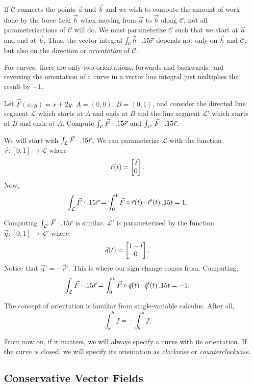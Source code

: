 If $\mathcal C$ connects the points $\vec a$ and $\vec b$ and we wish to compute
the amount of work done by the force field $\vec h$ when moving from $\vec a$ to
$\vec b$ along $\mathcal C$, not all parameterizations of $\mathcal C$ will
do.  We must parameterize $\mathcal C$ such that we start at $\vec a$ and
end at $\vec b$.  Thus, the vector integral $\int_{\mathcal C} \vec h\cdot .15\vec r$
depends not only on $\vec h$ and $\mathcal C$, but also on the direction
or \emph{orientation} of $\mathcal C$.

For curves, there are only two orientations, forwards and backwards,
and reversing the orientation of a curve in a vector line integral just multiplies
the result by $-1$.

\begin{example}
	Let $\vec F(x,y)=x+2y$, $A=(0,0)$, $B=(0,1)$, and consider the 
	directed line
	segment $\mathcal L$ which starts at $A$ and ends at $B$ and the line
	segment $\mathcal L'$ which starts at $B$ and ends at $A$.  Compute
	$\int_{\mathcal L}\vec F\cdot .15 \vec r$ and $\int_{\mathcal L'}\vec F\cdot .15 \vec r$.

	We will start with $\int_{\mathcal L}\vec F\cdot .15 \vec r$.  We can
	parameterize $\mathcal L$ with the function $\vec r:[0,1]\to\mathcal L$ where
	\[
		\vec r(t) = \mat{t\\0}.
	\]
	Now,
	\[
		\int_{\mathcal L}\vec F\cdot .15 \vec r = \int_0^1 \vec F\circ\vec r(t)\cdot
		\vec r'(t)\,.15 t = 1.
	\]

	Computing $\int_{\mathcal L'}\vec F\cdot .15 \vec r$ is similar.  $\mathcal L'$
	is parameterized by the function $\vec q:[0,1]\to\mathcal L'$ where
	\[
		\vec q(t) = \begin{bmatrix}1-t\\0\end{bmatrix}.
	\]
	Notice that $\vec q' = -\vec r'$.  This is where our sign change comes from.
	Computing,
	\[
		\int_{\mathcal L}\vec F\cdot .15 \vec r = \int_0^1 \vec F\circ\vec q(t)\cdot
		\vec q'(t)\,.15 t = -1.
	\]
\end{example}


The concept of orientation is familiar from single-variable calculus.
After all,
\[
	\int_a^b f=-\int_b^a f.
\]

From now on, if it matters, we will always specify a curve with
its orientation.  If the curve is closed, we will specify its orientation
as \emph{clockwise} or \emph{counterclockwise}.

\subsection{Conservative Vector Fields}

